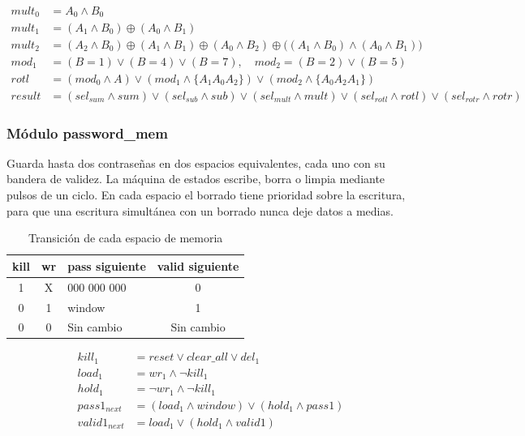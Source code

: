 \documentclass[11pt,letterpaper]{article}
\begin{document}
\begin{align*}
mult_0 &= A_0 \land B_0 \\
mult_1 &= (A_1 \land B_0) \oplus (A_0 \land B_1) \\
mult_2 &= (A_2 \land B_0) \oplus (A_1 \land B_1) \oplus (A_0 \land B_2) \oplus \big((A_1 \land B_0) \land (A_0 \land B_1)\big) \\
mod_1 &= (B = 1) \lor (B = 4) \lor (B = 7), \quad mod_2 = (B = 2) \lor (B = 5) \\
rotl &= (mod_0 \land A) \lor (mod_1 \land \{A_1 A_0 A_2\}) \lor (mod_2 \land \{A_0 A_2 A_1\}) \\
result &= (sel_{sum} \land sum) \lor (sel_{sub} \land sub) \lor (sel_{mult} \land mult) \lor (sel_{rotl} \land rotl) \lor (sel_{rotr} \land rotr)
\end{align*}

\subsubsection*{Módulo password\_mem}

Guarda hasta dos contraseñas en dos espacios equivalentes, cada uno con su bandera de validez. La máquina de estados escribe, borra o limpia mediante pulsos de un ciclo. En cada espacio el borrado tiene prioridad sobre la escritura, para que una escritura simultánea con un borrado nunca deje datos a medias.

\begin{table}[H]
\centering
\small
\caption{Transición de cada espacio de memoria}
\begin{tabular}{c c l c}
\toprule
\textbf{kill} & \textbf{wr} & \textbf{pass siguiente} & \textbf{valid siguiente} \\
\midrule
1 & X & 000 000 000 & 0 \\
0 & 1 & window & 1 \\
0 & 0 & Sin cambio & Sin cambio \\
\bottomrule
\end{tabular}
\end{table}

\begin{align*}
kill_1 &= reset \lor clear\_all \lor del_1 \\
load_1 &= wr_1 \land \lnot kill_1 \\
hold_1 &= \lnot wr_1 \land \lnot kill_1 \\
pass1_{next} &= (load_1 \land window) \lor (hold_1 \land pass1) \\
valid1_{next} &= load_1 \lor (hold_1 \land valid1)
\end{align*}
\end{document}
